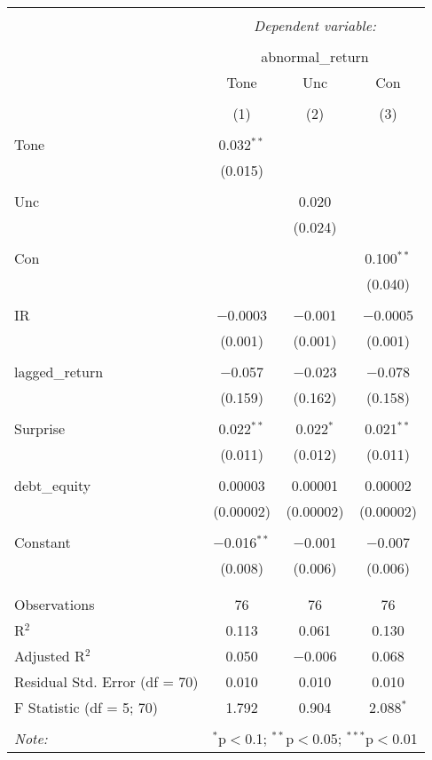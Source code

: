 \documentclass[
]{article}
\begin{document}
\begin{table}[!htbp] \centering 
  \caption{} 
  \label{} 
\begin{tabular}{@{\extracolsep{5pt}}lccc} 
\\[-1.8ex]\hline 
\hline \\[-1.8ex] 
 & \multicolumn{3}{c}{\textit{Dependent variable:}} \\ 
\cline{2-4} 
\\[-1.8ex] & \multicolumn{3}{c}{abnormal\_return} \\ 
 & Tone & Unc & Con \\ 
\\[-1.8ex] & (1) & (2) & (3)\\ 
\hline \\[-1.8ex] 
 Tone & 0.032$^{**}$ &  &  \\ 
  & (0.015) &  &  \\ 
  & & & \\ 
 Unc &  & 0.020 &  \\ 
  &  & (0.024) &  \\ 
  & & & \\ 
 Con &  &  & 0.100$^{**}$ \\ 
  &  &  & (0.040) \\ 
  & & & \\ 
 IR & $-$0.0003 & $-$0.001 & $-$0.0005 \\ 
  & (0.001) & (0.001) & (0.001) \\ 
  & & & \\ 
 lagged\_return & $-$0.057 & $-$0.023 & $-$0.078 \\ 
  & (0.159) & (0.162) & (0.158) \\ 
  & & & \\ 
 Surprise & 0.022$^{**}$ & 0.022$^{*}$ & 0.021$^{**}$ \\ 
  & (0.011) & (0.012) & (0.011) \\ 
  & & & \\ 
 debt\_equity & 0.00003 & 0.00001 & 0.00002 \\ 
  & (0.00002) & (0.00002) & (0.00002) \\ 
  & & & \\ 
 Constant & $-$0.016$^{**}$ & $-$0.001 & $-$0.007 \\ 
  & (0.008) & (0.006) & (0.006) \\ 
  & & & \\ 
\hline \\[-1.8ex] 
Observations & 76 & 76 & 76 \\ 
R$^{2}$ & 0.113 & 0.061 & 0.130 \\ 
Adjusted R$^{2}$ & 0.050 & $-$0.006 & 0.068 \\ 
Residual Std. Error (df = 70) & 0.010 & 0.010 & 0.010 \\ 
F Statistic (df = 5; 70) & 1.792 & 0.904 & 2.088$^{*}$ \\ 
\hline 
\hline \\[-1.8ex] 
\textit{Note:}  & \multicolumn{3}{r}{$^{*}$p$<$0.1; $^{**}$p$<$0.05; $^{***}$p$<$0.01} \\ 
\end{tabular} 
\end{table}
\end{document}
